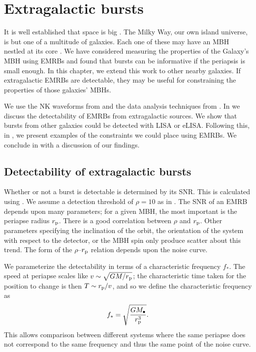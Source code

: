 \chapter{Extragalactic bursts}\label{ch:extragal}

It is well established that space is big \citep[chapter 8]{Adams1979}. The Milky Way, our own island universe, is but one of a multitude of galaxies. Each one of these may have an MBH nestled at its core \citep{Lynden-Bell1971, Soltan1982}. We have considered measuring the properties of the Galaxy's MBH using EMRBs and found that bursts can be informative if the periapsis is small enough. In this chapter, we extend this work to other nearby galaxies. If extragalactic EMRBs are detectable, they may be useful for constraining the properties of those galaxies' MBHs.

We use the NK waveforms from  and the data analysis techniques from . In  we discuss the detectability of EMRBs from extragalactic sources. We show that bursts from other galaxies could be detected with LISA or eLISA. Following this, in , we present examples of the constraints we could place using EMRBs. We conclude in  with a discussion of our findings.

\section{Detectability of extragalactic bursts}\label{sec:extragal-SNR}

Whether or not a burst is detectable is determined by its SNR. This is calculated using . We assume a detection threshold of $\rho = 10$ as in . The SNR of an EMRB depends upon many parameters; for a given MBH, the most important is the periapse radius $r_\mathrm{p}$. There is a good correlation between $\rho$ and $r_\mathrm{p}$. Other parameters specifying the inclination of the orbit, the orientation of the system with respect to the detector, or the MBH spin only produce scatter about this trend. The form of the $\rho$--$r_\mathrm{p}$ relation depends upon the noise curve.

We parameterize the detectability in terms of a characteristic frequency $f_\ast$. The speed at periapse scales like $v \sim \sqrt{GM/r_\mathrm{p}}$; the characteristic time taken for the position to change is then $T \sim r_\mathrm{p}/v$, and so we define the characteristic frequency as
\begin{equation}
f_\ast = \sqrt{\dfrac{GM_\bullet}{r_\mathrm{p}^3}}.
\end{equation}
This allows comparison between different systems where the same periapse does not correspond to the same frequency and thus the same point of the noise curve.


